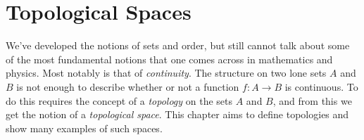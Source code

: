 \begingroup
    \ifcsname\PATH\endcsname
        \newcommand{\PATH}{books/Topology/Point_Set_Topology}
        \newcommand{\OLDPATH}{\PATH}
    \else
        \newcommand{\OLDPATH}{\PATH}
        \renewcommand{\PATH}{books/Topology/Point_Set_Topology}
    \fi
    \chapter{Topological Spaces}
        We've developed the notions of sets and order, but still cannot talk
        about some of the most fundamental notions that one comes across in
        mathematics and physics. Most notably is that of \textit{continuity}.
        The structure on two lone sets $A$ and $B$ is not enough to describe
        whether or not a function $f:A\rightarrow{B}$ is continuous. To do this
        requires the concept of a \textit{topology} on the sets $A$ and $B$, and
        from this we get the notion of a \textit{topological space}. This
        chapter aims to define topologies and show many examples of such spaces.
        
        

    \renewcommand{\PATH}{\OLDPATH}
\endgroup